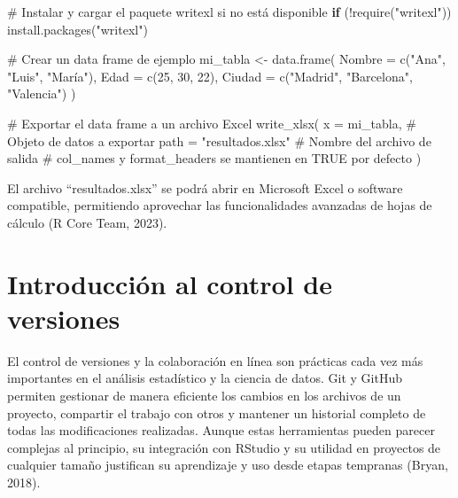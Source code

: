 \documentclass[
  spanish,
  a4paper,
  DIV=11,
  numbers=noendperiod,
  onepage,
  openany]{scrreprt}
\newenvironment{Shaded}{\begin{snugshade}}{\end{snugshade}}
\newcommand{\AttributeTok}[1]{\textcolor[rgb]{0.40,0.45,0.13}{#1}}
\newcommand{\CommentTok}[1]{\textcolor[rgb]{0.37,0.37,0.37}{#1}}
\newcommand{\ControlFlowTok}[1]{\textcolor[rgb]{0.00,0.23,0.31}{\textbf{#1}}}
\newcommand{\DecValTok}[1]{\textcolor[rgb]{0.68,0.00,0.00}{#1}}
\newcommand{\FunctionTok}[1]{\textcolor[rgb]{0.28,0.35,0.67}{#1}}
\newcommand{\NormalTok}[1]{\textcolor[rgb]{0.00,0.23,0.31}{#1}}
\newcommand{\OtherTok}[1]{\textcolor[rgb]{0.00,0.23,0.31}{#1}}
\newcommand{\SpecialCharTok}[1]{\textcolor[rgb]{0.37,0.37,0.37}{#1}}
\newcommand{\StringTok}[1]{\textcolor[rgb]{0.13,0.47,0.30}{#1}}
\begin{document}
\begin{Shaded}
\begin{Highlighting}[]
\CommentTok{\# Instalar y cargar el paquete writexl si no está disponible}
\ControlFlowTok{if}\NormalTok{ (}\SpecialCharTok{!}\FunctionTok{require}\NormalTok{(}\StringTok{"writexl"}\NormalTok{)) }\FunctionTok{install.packages}\NormalTok{(}\StringTok{"writexl"}\NormalTok{)}


\CommentTok{\# Crear un data frame de ejemplo}
\NormalTok{mi\_tabla }\OtherTok{\textless{}{-}} \FunctionTok{data.frame}\NormalTok{(}
  \AttributeTok{Nombre =} \FunctionTok{c}\NormalTok{(}\StringTok{"Ana"}\NormalTok{, }\StringTok{"Luis"}\NormalTok{, }\StringTok{"María"}\NormalTok{),}
  \AttributeTok{Edad =} \FunctionTok{c}\NormalTok{(}\DecValTok{25}\NormalTok{, }\DecValTok{30}\NormalTok{, }\DecValTok{22}\NormalTok{),}
  \AttributeTok{Ciudad =} \FunctionTok{c}\NormalTok{(}\StringTok{"Madrid"}\NormalTok{, }\StringTok{"Barcelona"}\NormalTok{, }\StringTok{"Valencia"}\NormalTok{)}
\NormalTok{)}

\CommentTok{\# Exportar el data frame a un archivo Excel}
\FunctionTok{write\_xlsx}\NormalTok{(}
  \AttributeTok{x =}\NormalTok{ mi\_tabla,            }\CommentTok{\# Objeto de datos a exportar}
  \AttributeTok{path =} \StringTok{"resultados.xlsx"} \CommentTok{\# Nombre del archivo de salida}
  \CommentTok{\# col\_names y format\_headers se mantienen en TRUE por defecto}
\NormalTok{)}
\end{Highlighting}
\end{Shaded}

El archivo ``resultados.xlsx'' se podrá abrir en Microsoft Excel o
software compatible, permitiendo aprovechar las funcionalidades
avanzadas de hojas de cálculo (R Core Team, 2023).


\chapter{Introducción al control de
versiones}\label{introducciuxf3n-al-control-de-versiones}

El control de versiones y la colaboración en línea son prácticas cada
vez más importantes en el análisis estadístico y la ciencia de datos.
Git y GitHub permiten gestionar de manera eficiente los cambios en los
archivos de un proyecto, compartir el trabajo con otros y mantener un
historial completo de todas las modificaciones realizadas. Aunque estas
herramientas pueden parecer complejas al principio, su integración con
RStudio y su utilidad en proyectos de cualquier tamaño justifican su
aprendizaje y uso desde etapas tempranas (Bryan, 2018).
\end{document}
